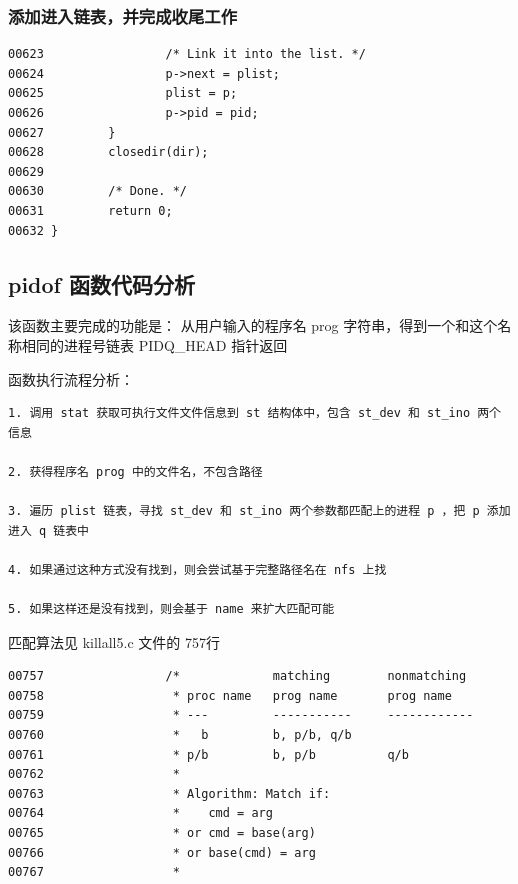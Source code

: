 \subsubsection{添加进入链表，并完成收尾工作}

{\begin{shaded}\begin{verbatim}
00623                 /* Link it into the list. */
00624                 p->next = plist;
00625                 plist = p;
00626                 p->pid = pid;
00627         }
00628         closedir(dir);
00629 
00630         /* Done. */
00631         return 0;
00632 }
\end{verbatim}\end{shaded}}
\subsection{pidof 函数代码分析}

该函数主要完成的功能是： 从用户输入的程序名 prog
字符串，得到一个和这个名称相同的进程号链表 PIDQ\_HEAD 指针返回

函数执行流程分析：

{\begin{shaded}\begin{verbatim}
1. 调用 stat 获取可执行文件文件信息到 st 结构体中，包含 st_dev 和 st_ino 两个信息

2. 获得程序名 prog 中的文件名，不包含路径

3. 遍历 plist 链表，寻找 st_dev 和 st_ino 两个参数都匹配上的进程 p ，把 p 添加进入 q 链表中

4. 如果通过这种方式没有找到，则会尝试基于完整路径名在 nfs 上找

5. 如果这样还是没有找到，则会基于 name 来扩大匹配可能
\end{verbatim}\end{shaded}}
匹配算法见 killall5.c 文件的 757行

{\begin{shaded}\begin{verbatim}
00757                 /*             matching        nonmatching
00758                  * proc name   prog name       prog name
00759                  * ---         -----------     ------------
00760                  *   b         b, p/b, q/b
00761                  * p/b         b, p/b          q/b
00762                  *
00763                  * Algorithm: Match if:
00764                  *    cmd = arg
00765                  * or cmd = base(arg)
00766                  * or base(cmd) = arg
00767                  *
\end{verbatim}\end{shaded}}
